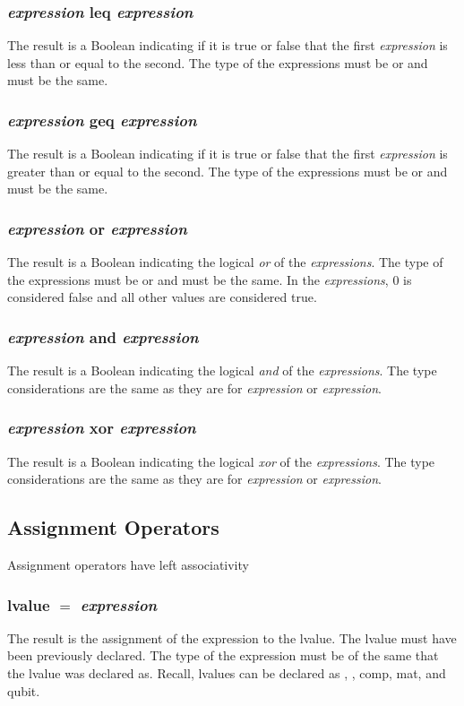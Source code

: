 \subsubsection{\textit{expression} leq \textit{expression}}
The result is a Boolean indicating if it is true or false that the first \textit{expression} is less than  or equal to the second. The type of the expressions must be \integ or \float and must be the same. 
\subsubsection{\textit{expression} geq \textit{expression}}
The result is a Boolean indicating if it is true or false that the first \textit{expression} is greater than or equal to the second. The type of the expressions must be \integ or \float and must be the same. 
\subsubsection{\textit{expression} or \textit{expression}}
The result is a Boolean indicating the logical \textit{or} of the \textit{expressions}. The type of the expressions must be \integ or \float and must be the same. In the \textit{expressions}, 0 is considered \textsf{false} and all other values are considered \textsf{true}.
\subsubsection{\textit{expression} and \textit{expression}}
The result is a Boolean indicating the logical \textit{and} of the \textit{expressions}. The type considerations are the same as they are for \textit{expression} or \textit{expression}.
\subsubsection{\textit{expression} xor \textit{expression}}
The result is a Boolean indicating the logical \textit{xor} of the \textit{expressions}. The type considerations are the same as they are for \textit{expression} or \textit{expression}.
\subsection{Assignment Operators}
Assignment operators have left associativity
\subsubsection{lvalue $=$ \textit{expression}}
The result is the assignment of the expression to the lvalue. The lvalue must have been previously declared. The type of the expression must be of the same that the lvalue was declared as. Recall, lvalues can be declared as \integ, \float, comp, mat, and qubit.
